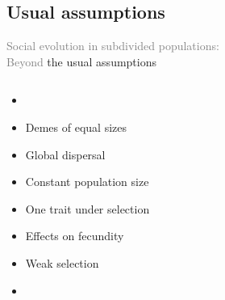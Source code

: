 \documentclass[]{beamer}
\begin{document}
\subsection{Usual assumptions}
\begin{frame}{\textcolor<1-7>{gray}{Social evolution in subdivided populations:}\\ \textcolor<1-7>{gray}{Beyond }the usual assumptions}

\begin{columns}[c]
\begin{column}{0.55\textwidth} 
\begin{itemize}[<+-|alert@+>]
\item {}
\item Demes of equal sizes
\item Global dispersal
\item Constant population size
\item One trait under selection
\item Effects on fecundity
\item Weak selection
\item {}
\end{itemize}
\end{column}

\begin{column}{0.45\textwidth} 
\begin{center}







\end{center}
\end{column}
\end{columns}
\end{frame}
\end{document}
